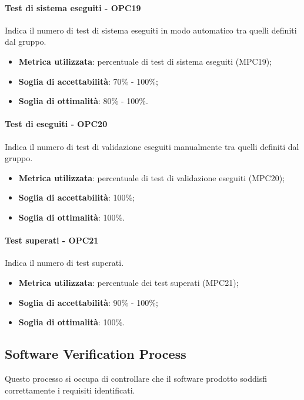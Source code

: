 \documentclass[PdQ.tex]{subfiles}
\begin{document}
			\paragraph{Test di sistema eseguiti - OPC19}
				Indica il numero di test di sistema eseguiti in modo automatico tra quelli definiti dal gruppo.
				\begin{itemize}
					\item \textbf{Metrica utilizzata}: percentuale di test di sistema eseguiti (MPC19);
					\item \textbf{Soglia di accettabilità}: 70\% - 100\%;
					\item \textbf{Soglia di ottimalità}: 80\% - 100\%.
				\end{itemize}

			\paragraph{Test di  eseguiti - OPC20}
				Indica il numero di test di validazione eseguiti manualmente tra quelli definiti dal gruppo.
				\begin{itemize}
					\item \textbf{Metrica utilizzata}: percentuale di test di validazione eseguiti (MPC20);
					\item \textbf{Soglia di accettabilità}: 100\%;
					\item \textbf{Soglia di ottimalità}: 100\%.
				\end{itemize}

			\paragraph{Test superati - OPC21}
				Indica il numero di test superati.
				\begin{itemize}
					\item \textbf{Metrica utilizzata}: percentuale dei test superati (MPC21);
					\item \textbf{Soglia di accettabilità}: 90\% - 100\%;
					\item \textbf{Soglia di ottimalità}: 100\%.
				\end{itemize}
	\subsection{Software Verification Process}
		Questo processo si occupa di controllare che il software prodotto soddisfi correttamente i requisiti identificati.
\end{document}
